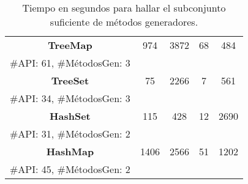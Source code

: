 \begin{table}[H]
\begin{tabular}{cccccc}
\multicolumn{2}{c}{\textbf{TreeMap}}        & 974  & 3872 & 68  & 484  \\
\multicolumn{2}{c}{\tiny \#API: 61, \#MétodosGen: 3} & & & & \\

\multicolumn{2}{c}{\textbf{TreeSet}}        & 75     & 2266 & 7    & 561  \\
\multicolumn{2}{c}{\tiny \#API: 34, \#MétodosGen: 3} & & & & \\

\multicolumn{2}{c}{\textbf{HashSet}}        & 115  & 428   & 12  & 2690 \\
\multicolumn{2}{c}{\tiny \#API: 31, \#MétodosGen: 2} & & & & \\

\multicolumn{2}{c}{\textbf{HashMap}}        & 1406 & 2566 & 51   & 1202 \\
\multicolumn{2}{c}{\tiny \#API: 45, \#MétodosGen: 2} & & & & \\
\hline
\end{tabular}

\caption{Tiempo en segundos para hallar el subconjunto suficiente de métodos generadores.}
\label{tab:eficiencia}
\end{table}

